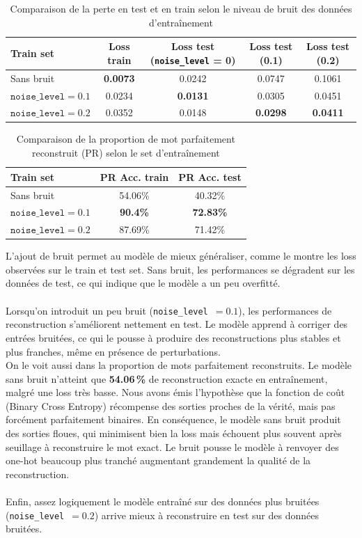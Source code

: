 \documentclass{article}
\begin{document}
\begin{table}[H]
\centering
\begin{tabular}{lcccc}
\hline
\textbf{Train set} & \textbf{Loss train} & \textbf{Loss test (\texttt{noise\_level} = 0)} & \textbf{Loss test (0.1)} & \textbf{Loss test (0.2)} \\
\hline
Sans bruit & \textbf{0.0073} & 0.0242 & 0.0747 & 0.1061 \\
$\texttt{noise\_level} = 0.1$ & 0.0234 & \textbf{0.0131} & 0.0305 & 0.0451  \\
$\texttt{noise\_level} = 0.2$ & 0.0352 & 0.0148 & \textbf{0.0298} & \textbf{0.0411} \\
\hline
\end{tabular}
\caption{Comparaison de la perte en test et en train selon le niveau de bruit des données d'entraînement}
\end{table}

\begin{table}[H]
\centering
\begin{tabular}{lcc}
\hline
\textbf{Train set} & \textbf{PR Acc. train} & \textbf{PR Acc. test}  \\
\hline
Sans bruit & 54.06\% & 40.32\% \\
$\texttt{noise\_level} = 0.1$ & \textbf{90.4\%} & \textbf{72.83\%} \\
$\texttt{noise\_level} = 0.2$ & 87.69\% & 71.42\%  \\
\hline
\end{tabular}
\caption{Comparaison de la proportion de mot parfaitement reconstruit (PR) selon le set d'entraînement}
\end{table}

L’ajout de bruit permet au modèle de mieux généraliser, comme le montre les loss observées sur le train et test set. Sans bruit, les performances se dégradent sur les données de test, ce qui indique que le modèle a un peu overfitté.
\\ \\
Lorsqu’on introduit un peu bruit (\texttt{noise\_level}~$=0.1$), les performances de reconstruction s’améliorent nettement en test. Le modèle apprend à corriger des entrées bruitées, ce qui le pousse à produire des reconstructions plus stables et plus franches, même en présence de perturbations.
\\
On le voit aussi dans la proportion de mots parfaitement reconstruits. Le modèle sans bruit n’atteint que \textbf{54.06\,\%} de reconstruction exacte en entraînement, malgré une loss très basse. Nous avons émis l'hypothèse que la fonction de coût (Binary Cross Entropy) récompense des sorties proches de la vérité, mais pas forcément parfaitement binaires. En conséquence, le modèle sans bruit produit des sorties floues, qui minimisent bien la loss mais échouent plus souvent après seuillage à reconstruire le mot exact. Le bruit pousse le modèle à renvoyer des one-hot beaucoup plus tranché augmentant grandement la qualité de la reconstruction.
\\ \\
Enfin, assez logiquement le modèle entraîné sur des données plus bruitées (\texttt{noise\_level}~$=0.2$) arrive mieux à reconstruire en test sur des données bruitées.
\end{document}
